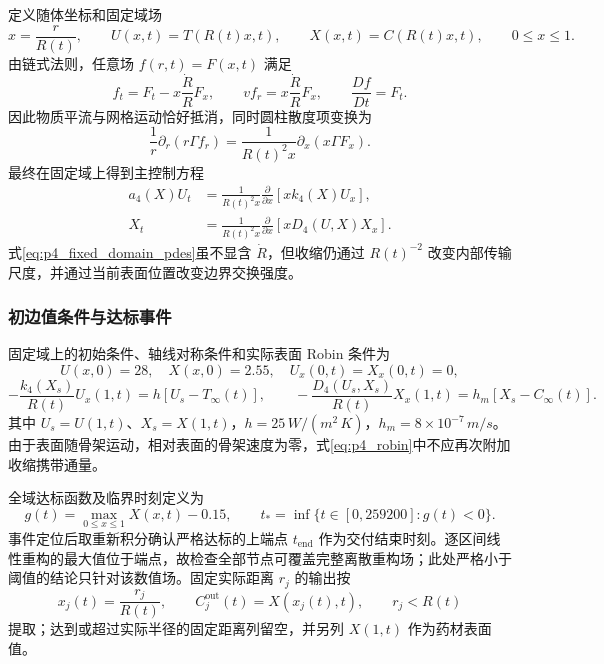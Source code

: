 \documentclass[withoutpreface,bwprint]{cumcmthesis}
\begin{document}
定义随体坐标和固定域场
\begin{equation}
x=\frac{r}{R(t)},\qquad
U(x,t)=T(R(t)x,t),\qquad X(x,t)=C(R(t)x,t),\qquad 0\le x\le1.
\label{eq:p4_coordinate_transform}
\end{equation}
由链式法则，任意场 $f(r,t)=F(x,t)$ 满足
\begin{equation}
f_t=F_t-x\frac{\dot R}{R}F_x,\qquad
vf_r=x\frac{\dot R}{R}F_x,\qquad
\frac{Df}{Dt}=F_t.
\label{eq:p4_material_derivative}
\end{equation}
因此物质平流与网格运动恰好抵消，同时圆柱散度项变换为
\begin{equation}
\frac{1}{r}\partial_r(r\Gamma f_r)
=\frac{1}{R(t)^2x}\partial_x(x\Gamma F_x).
\label{eq:p4_divergence_transform}
\end{equation}
最终在固定域上得到主控制方程
\begin{equation}
\boxed{\begin{aligned}
a_4(X)U_t&=\frac{1}{R(t)^2x}\frac{\partial}{\partial x}
\left[xk_4(X)U_x\right],\\
X_t&=\frac{1}{R(t)^2x}\frac{\partial}{\partial x}
\left[xD_4(U,X)X_x\right].
\end{aligned}}
\label{eq:p4_fixed_domain_pdes}
\end{equation}
式\eqref{eq:p4_fixed_domain_pdes}虽不显含 $\dot R$，但收缩仍通过 $R(t)^{-2}$ 改变内部传输尺度，并通过当前表面位置改变边界交换强度。

\subsubsection{初边值条件与达标事件}

固定域上的初始条件、轴线对称条件和实际表面 Robin 条件为
\begin{equation}
U(x,0)=28,\quad X(x,0)=2.55,\quad
U_x(0,t)=X_x(0,t)=0,
\label{eq:p4_initial_center}
\end{equation}
\begin{equation}
-\frac{k_4(X_s)}{R(t)}U_x(1,t)=h[U_s-T_\infty(t)],\qquad
-\frac{D_4(U_s,X_s)}{R(t)}X_x(1,t)=h_m[X_s-C_\infty(t)].
\label{eq:p4_robin}
\end{equation}
其中 $U_s=U(1,t)$、$X_s=X(1,t)$，$h=25\,\si{W/(m^2\,K)}$，$h_m=8\times10^{-7}\,\si{m/s}$。由于表面随骨架运动，相对表面的骨架速度为零，式\eqref{eq:p4_robin}中不应再次附加收缩携带通量。

全域达标函数及临界时刻定义为
\begin{equation}
g(t)=\max_{0\le x\le1}X(x,t)-0.15,\qquad
t_*=\inf\{t\in[0,259200]:g(t)<0\}.
\label{eq:p4_event}
\end{equation}
事件定位后取重新积分确认严格达标的上端点 $t_{\mathrm{end}}$ 作为交付结束时刻。逐区间线性重构的最大值位于端点，故检查全部节点可覆盖完整离散重构场；此处严格小于阈值的结论只针对该数值场。固定实际距离 $r_j$ 的输出按
\begin{equation}
x_j(t)=\frac{r_j}{R(t)},\qquad
C_j^{\mathrm{out}}(t)=X(x_j(t),t),\qquad r_j<R(t)
\label{eq:p4_output_mapping}
\end{equation}
提取；达到或超过实际半径的固定距离列留空，并另列 $X(1,t)$ 作为药材表面值。
\end{document}
